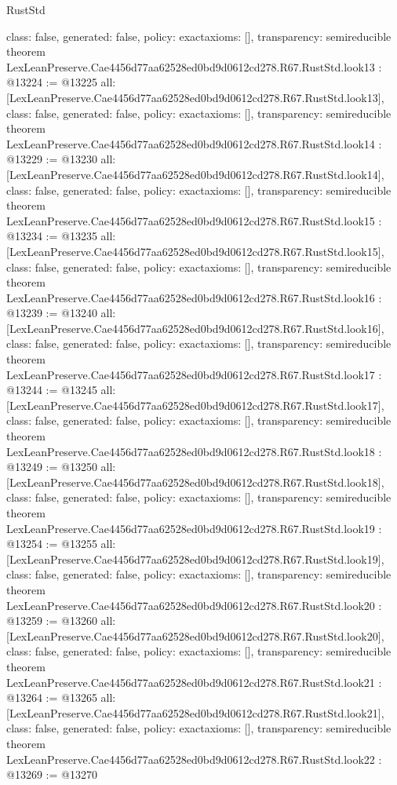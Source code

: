 \begin{lexlean}{RustStd}
\begin{coremodule}
{  class: false,
  generated: false,
  policy: exact{axioms: []},
  transparency: semireducible
}
theorem LexLeanPreserve.Cae4456d77aa62528ed0bd9d0612cd278.R67.RustStd.look13 : @13224 := @13225 {
  all: [LexLeanPreserve.Cae4456d77aa62528ed0bd9d0612cd278.R67.RustStd.look13],
  class: false,
  generated: false,
  policy: exact{axioms: []},
  transparency: semireducible
}
theorem LexLeanPreserve.Cae4456d77aa62528ed0bd9d0612cd278.R67.RustStd.look14 : @13229 := @13230 {
  all: [LexLeanPreserve.Cae4456d77aa62528ed0bd9d0612cd278.R67.RustStd.look14],
  class: false,
  generated: false,
  policy: exact{axioms: []},
  transparency: semireducible
}
theorem LexLeanPreserve.Cae4456d77aa62528ed0bd9d0612cd278.R67.RustStd.look15 : @13234 := @13235 {
  all: [LexLeanPreserve.Cae4456d77aa62528ed0bd9d0612cd278.R67.RustStd.look15],
  class: false,
  generated: false,
  policy: exact{axioms: []},
  transparency: semireducible
}
theorem LexLeanPreserve.Cae4456d77aa62528ed0bd9d0612cd278.R67.RustStd.look16 : @13239 := @13240 {
  all: [LexLeanPreserve.Cae4456d77aa62528ed0bd9d0612cd278.R67.RustStd.look16],
  class: false,
  generated: false,
  policy: exact{axioms: []},
  transparency: semireducible
}
theorem LexLeanPreserve.Cae4456d77aa62528ed0bd9d0612cd278.R67.RustStd.look17 : @13244 := @13245 {
  all: [LexLeanPreserve.Cae4456d77aa62528ed0bd9d0612cd278.R67.RustStd.look17],
  class: false,
  generated: false,
  policy: exact{axioms: []},
  transparency: semireducible
}
theorem LexLeanPreserve.Cae4456d77aa62528ed0bd9d0612cd278.R67.RustStd.look18 : @13249 := @13250 {
  all: [LexLeanPreserve.Cae4456d77aa62528ed0bd9d0612cd278.R67.RustStd.look18],
  class: false,
  generated: false,
  policy: exact{axioms: []},
  transparency: semireducible
}
theorem LexLeanPreserve.Cae4456d77aa62528ed0bd9d0612cd278.R67.RustStd.look19 : @13254 := @13255 {
  all: [LexLeanPreserve.Cae4456d77aa62528ed0bd9d0612cd278.R67.RustStd.look19],
  class: false,
  generated: false,
  policy: exact{axioms: []},
  transparency: semireducible
}
theorem LexLeanPreserve.Cae4456d77aa62528ed0bd9d0612cd278.R67.RustStd.look20 : @13259 := @13260 {
  all: [LexLeanPreserve.Cae4456d77aa62528ed0bd9d0612cd278.R67.RustStd.look20],
  class: false,
  generated: false,
  policy: exact{axioms: []},
  transparency: semireducible
}
theorem LexLeanPreserve.Cae4456d77aa62528ed0bd9d0612cd278.R67.RustStd.look21 : @13264 := @13265 {
  all: [LexLeanPreserve.Cae4456d77aa62528ed0bd9d0612cd278.R67.RustStd.look21],
  class: false,
  generated: false,
  policy: exact{axioms: []},
  transparency: semireducible
}
theorem LexLeanPreserve.Cae4456d77aa62528ed0bd9d0612cd278.R67.RustStd.look22 : @13269 := @13270 {
}
\end{coremodule}
\end{lexlean}
